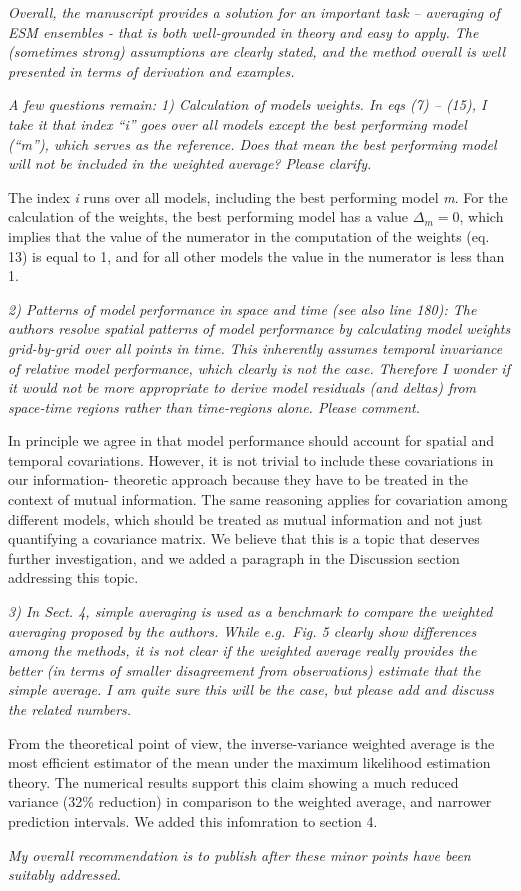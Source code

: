 \emph{Overall, the manuscript provides a solution for an important task
-- averaging of ESM ensembles - that is both well-grounded in theory and
easy to apply. The (sometimes strong) assumptions are clearly stated,
and the method overall is well presented in terms of derivation and
examples.}

\emph{A few questions remain: 1) Calculation of models weights. In eqs
(7) -- (15), I take it that index ``i'' goes over all models except the
best performing model (``m''), which serves as the reference. Does that
mean the best performing model will not be included in the weighted
average? Please clarify.}

The index \emph{i} runs over all models, including the best performing
model \emph{m}. For the calculation of the weights, the best performing
model has a value \(\Delta_m =0\), which implies that the value of the
numerator in the computation of the weights (eq. 13) is equal to 1, and
for all other models the value in the numerator is less than 1.

\emph{2) Patterns of model performance in space and time (see also line
180): The authors resolve spatial patterns of model performance by
calculating model weights grid-by-grid over all points in time. This
inherently assumes temporal invariance of relative model performance,
which clearly is not the case. Therefore I wonder if it would not be
more appropriate to derive model residuals (and deltas) from space-time
regions rather than time-regions alone. Please comment.}

In principle we agree in that model performance should account for
spatial and temporal covariations. However, it is not trivial to include
these covariations in our information- theoretic approach because they
have to be treated in the context of mutual information. The same
reasoning applies for covariation among different models, which should
be treated as mutual information and not just quantifying a covariance
matrix. We believe that this is a topic that deserves further
investigation, and we added a paragraph in the Discussion section
addressing this topic.

\emph{3) In Sect. 4, simple averaging is used as a benchmark to compare
the weighted averaging proposed by the authors. While e.g.~Fig. 5
clearly show differences among the methods, it is not clear if the
weighted average really provides the better (in terms of smaller
disagreement from observations) estimate that the simple average. I am
quite sure this will be the case, but please add and discuss the related
numbers.}

From the theoretical point of view, the inverse-variance weighted
average is the most efficient estimator of the mean under the maximum
likelihood estimation theory. The numerical results support this claim
showing a much reduced variance (32\% reduction) in comparison to the
weighted average, and narrower prediction intervals. We added this
infomration to section 4.

\emph{My overall recommendation is to publish after these minor points
have been suitably addressed.}
